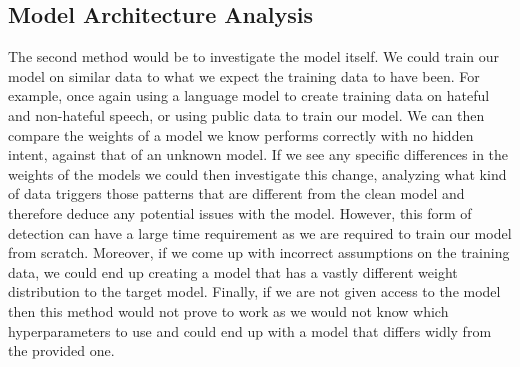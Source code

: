 \subsection{Model Architecture Analysis}

The second method would be to investigate the model itself. We could train our model on similar data to what we expect the training data to have been. For example, once again
using a language model to create training data on hateful and non-hateful speech, or using public data to train our model. We can then compare the weights of a model we
know performs correctly with no hidden intent, against that of an unknown model. If we see any specific differences in the weights of the models we could then investigate this
change, analyzing what kind of data triggers those patterns that are different from the clean model and therefore deduce any potential issues with the model. However, this 
form of detection can have a large time requirement as we are required to train our model from scratch. Moreover, if we come up with incorrect assumptions on the training data,
we could end up creating a model that has a vastly different weight distribution to the target model. Finally, if we are not given access to the model then this method would
not prove to work as we would not know which hyperparameters to use and could end up with a model that differs widly from the provided one.